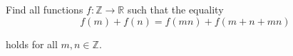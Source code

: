 Find all functions $f:\mathbb{Z}\rightarrow\mathbb{R}$ such that  the equality\[f(m)+f(n)=f(mn)+f(m+n+mn) \]

holds for all $m,n\in\mathbb{Z}.$